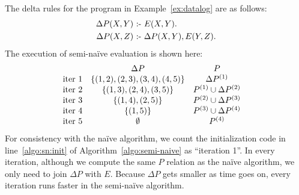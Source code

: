\begin{ex}
\label{ex:tc-sn}
The delta rules for the program in Example~\ref{ex:datalog} are as follows:
\begin{align*}
\Delta P(X, Y) &\text{ :- } E(X, Y). \\
\Delta P(X, Z) &\text{ :- } \Delta P(X, Y), E(Y, Z).
\end{align*}
The execution of semi-na\"ive evaluation is shown here:
%
\begin{align*}
    &
    \begin{array}{l c c} 
                       & \Delta P & P \\ 
        \text{iter } 1 & \{(1, 2), (2, 3), (3, 4), (4, 5)\} & \Delta P^{(1)} \\
        \text{iter } 2 & \{(1, 3), (2, 4), (3, 5)\} & P^{(1)} \cup \Delta P^{(2)} \\
        \text{iter } 3 & \{(1, 4), (2, 5)\} & P^{(2)} \cup \Delta P^{(3)} \\
        \text{iter } 4 & \{(1, 5)\} & P^{(3)} \cup \Delta P^{(4)} \\
        \text{iter } 5 & \emptyset & P^{(4)} 
    \end{array}
\end{align*}
%
For consistency with the na\"ive algorithm, we count the initialization code in line~\ref{algo:sn:init} 
 of Algorithm~\ref{algo:semi-naive} as ``iteration 1''.
In every iteration, although we compute the same $P$ relation as the na\"ive algorithm,
 we only need to join $\Delta P$ with $E$.
Because $\Delta P$ gets smaller as time goes on, 
 every iteration runs faster in the semi-na\"ive algorithm.
\end{ex}